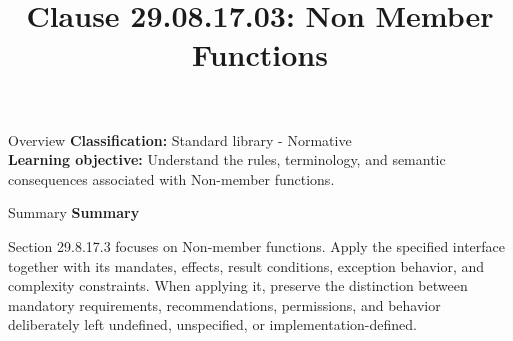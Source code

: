 \documentclass[10pt,letterpaper]{article}
\title{Clause 29.08.17.03: Non Member Functions}
\author{}
\date{}
\begin{document}
\maketitle
\begin{CornellOverviewBox}{Overview}
\textbf{Classification:} Standard library - Normative\\[2pt]
\textbf{Learning objective:} Understand the rules, terminology, and semantic consequences associated with Non-member functions.
\end{CornellOverviewBox}\begin{CornellSummaryBox}{Summary}
{\sffamily\bfseries\color{Accent} Summary}\par\vspace{3pt}Section 29.8.17.3 focuses on Non-member functions. Apply the specified interface together with its mandates, effects, result conditions, exception behavior, and complexity constraints. When applying it, preserve the distinction between mandatory requirements, recommendations, permissions, and behavior deliberately left undefined, unspecified, or implementation-defined.
\end{CornellSummaryBox}
\end{document}
